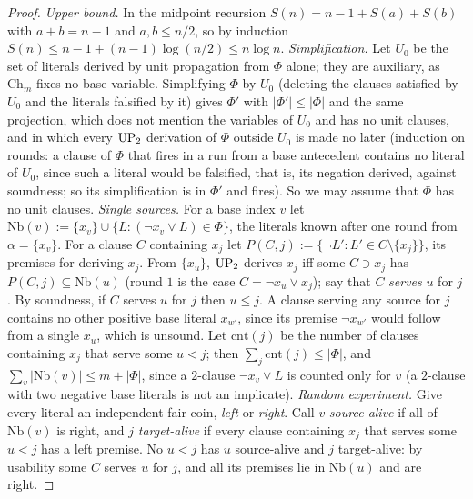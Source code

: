 \begin{proof}
\emph{Upper bound.} In the midpoint recursion $S(n)=n-1+S(a)+S(b)$ with $a+b=n-1$ and $a,b\le n/2$, so by induction $S(n)\le n-1+(n-1)\log(n/2)\le n\log n$.
\emph{Simplification.} Let $U_0$ be the set of literals derived by unit propagation from $\Phi$ alone; they are auxiliary, as $\mathrm{Ch}_m$ fixes no base variable. Simplifying $\Phi$ by $U_0$ (deleting the clauses satisfied by $U_0$ and the literals falsified by it) gives $\Phi'$ with $\lvert\Phi'\rvert\le\lvert\Phi\rvert$ and the same projection, which does not mention the variables of $U_0$ and has no unit clauses, and in which every $\mathrm{UP}_2$ derivation of $\Phi$ outside $U_0$ is made no later (induction on rounds: a clause of $\Phi$ that fires in a run from a base antecedent contains no literal of $U_0$, since such a literal would be falsified, that is, its negation derived, against soundness; so its simplification is in $\Phi'$ and fires). So we may assume that $\Phi$ has no unit clauses.
\emph{Single sources.} For a base index $v$ let $\mathrm{Nb}(v):=\{x_v\}\cup\{L:(\neg x_v\vee L)\in\Phi\}$, the literals known after one round from $\alpha=\{x_v\}$. For a clause $C$ containing $x_j$ let $P(C,j):=\{\neg L':L'\in C\setminus\{x_j\}\}$, its premises for deriving $x_j$. From $\{x_u\}$, $\mathrm{UP}_2$ derives $x_j$ iff some $C\ni x_j$ has $P(C,j)\subseteq\mathrm{Nb}(u)$ (round $1$ is the case $C=\neg x_u\vee x_j$); say that $C$ \emph{serves} $u$ for $j$. By soundness, if $C$ serves $u$ for $j$ then $u\le j$. A clause serving any source for $j$ contains no other positive base literal $x_{w'}$, since its premise $\neg x_{w'}$ would follow from a single $x_u$, which is unsound. Let $\mathrm{cnt}(j)$ be the number of clauses containing $x_j$ that serve some $u<j$; then $\sum_j\mathrm{cnt}(j)\le\lvert\Phi\rvert$, and $\sum_v\lvert\mathrm{Nb}(v)\rvert\le m+\lvert\Phi\rvert$, since a $2$-clause $\neg x_v\vee L$ is counted only for $v$ (a $2$-clause with two negative base literals is not an implicate).
\emph{Random experiment.} Give every literal an independent fair coin, \emph{left} or \emph{right}. Call $v$ \emph{source-alive} if all of $\mathrm{Nb}(v)$ is right, and $j$ \emph{target-alive} if every clause containing $x_j$ that serves some $u<j$ has a left premise. No $u<j$ has $u$ source-alive and $j$ target-alive: by usability some $C$ serves $u$ for $j$, and all its premises lie in $\mathrm{Nb}(u)$ and are right.

\end{proof}
